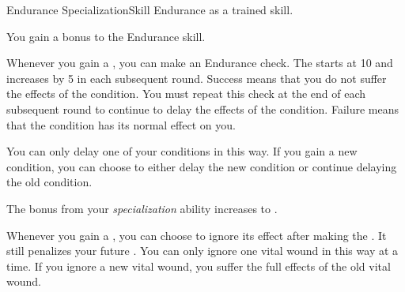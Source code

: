     \begin{feat}{Endurance Specialization}{Skill}
        \featpre Endurance as a trained skill.

         You gain a  bonus to the Endurance skill.

         Whenever you gain a , you can make an Endurance check.
        The  starts at 10 and increases by 5 in each subsequent round.
        Success means that you do not suffer the effects of the condition.
        You must repeat this check at the end of each subsequent round to continue to delay the effects of the condition.
        Failure means that the condition has its normal effect on you.

        You can only delay one of your conditions in this way.
        If you gain a new condition, you can choose to either delay the new condition or continue delaying the old condition.

         The bonus from your \textit{specialization} ability increases to .

         Whenever you gain a , you can choose to ignore its effect after making the .
        It still penalizes your future .
        You can only ignore one vital wound in this way at a time.
        If you ignore a new vital wound, you suffer the full effects of the old vital wound.
    \end{feat}


